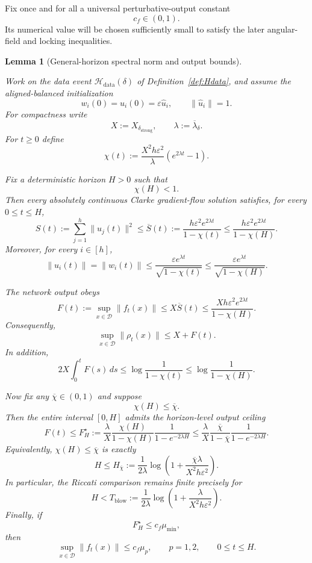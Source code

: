 \documentclass{article} %
\theoremstyle{plain}
\newtheorem{lemma}[theorem]{Lemma}
\theoremstyle{definition}
\theoremstyle{remark}
\begin{document}
Fix once and for all a universal perturbative-output constant
\[
\boxed{
c_f\in(0,1).
}
\]
Its numerical value will be chosen sufficiently small to satisfy the later
angular-field and locking inequalities.


\begin{lemma}[General-horizon spectral norm and output bounds]
\label{lem:norm-output}

Work on the data event $\mathcal H_{\mathrm{data}}(\delta)$ of
Definition~\ref{def:Hdata}, and assume the aligned-balanced initialization
\[
w_i(0)=u_i(0)=\varepsilon\widehat u_i,
\qquad
\|\widehat u_i\|=1.
\]
For compactness write
\[
X:=X_{\delta_{\mathrm{strong}}},
\qquad
\lambda:=\overline\lambda_\delta.
\]
For $t\ge0$ define
\[
\boxed{
\chi(t)
:=
\frac{X^2h\varepsilon^2}{\lambda}
\left(e^{2\lambda t}-1\right).
}
\]

Fix a deterministic horizon $H>0$ such that
\[
\boxed{\chi(H)<1.}
\]
Then every absolutely continuous Clarke gradient-flow solution satisfies,
for every $0\le t\le H$,
\[
\boxed{
S(t)
:=
\sum_{j=1}^h\|u_j(t)\|^2
\le
\overline S(t)
:=
\frac{h\varepsilon^2e^{2\lambda t}}{1-\chi(t)}
\le
\frac{h\varepsilon^2e^{2\lambda t}}{1-\chi(H)}.
}
\]
Moreover, for every $i\in[h]$,
\[
\boxed{
\|u_i(t)\|
=
\|w_i(t)\|
\le
\frac{\varepsilon e^{\lambda t}}{\sqrt{1-\chi(t)}}
\le
\frac{\varepsilon e^{\lambda t}}{\sqrt{1-\chi(H)}}.
}
\]

The network output obeys
\[
\boxed{
F(t)
:=
\sup_{x\in\mathcal D}\|f_t(x)\|
\le
X\overline S(t)
\le
\frac{Xh\varepsilon^2e^{2\lambda t}}{1-\chi(H)}.
}
\]
Consequently,
\[
\boxed{
\sup_{x\in\mathcal D}\|\rho_t(x)\|
\le
X+F(t).
}
\]
In addition,
\[
\boxed{
2X\int_0^tF(s)\,ds
\le
\log\frac1{1-\chi(t)}
\le
\log\frac1{1-\chi(H)}.
}
\]

Now fix any $\overline\chi\in(0,1)$ and suppose
\[
\boxed{\chi(H)\le\overline\chi.}
\]
Then the entire interval $[0,H]$ admits the horizon-level output ceiling
\[
\boxed{
F(t)
\le
F_H^\star
:=
\frac{\lambda}{X}
\frac{\chi(H)}{1-\chi(H)}
\frac1{1-e^{-2\lambda H}}
\le
\frac{\lambda}{X}
\frac{\overline\chi}{1-\overline\chi}
\frac1{1-e^{-2\lambda H}}.
}
\]
Equivalently, $\chi(H)\le\overline\chi$ is exactly
\[
\boxed{
H
\le
H_{\overline\chi}
:=
\frac1{2\lambda}
\log\left(
1+\frac{\overline\chi\lambda}{X^2h\varepsilon^2}
\right).
}
\]
In particular, the Riccati comparison remains finite precisely for
\[
\boxed{
H
<
T_{\mathrm{blow}}
:=
\frac1{2\lambda}
\log\left(
1+\frac{\lambda}{X^2h\varepsilon^2}
\right).
}
\]
Finally, if
\[
F_H^\star\le c_f\mu_{\min},
\]
then
\[
\boxed{
\sup_{x\in\mathcal D}\|f_t(x)\|
\le
c_f\mu_p,
\qquad p=1,2,
\qquad 0\le t\le H.
}
\]
\end{lemma}
\end{document}
